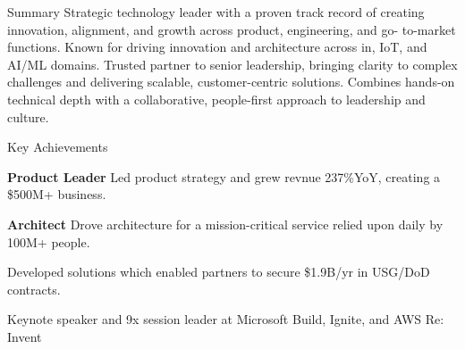 \documentclass{resume} %
\begin{document}
\vspace{-1em}
\begin{rSummary}{Summary}
  Strategic technology leader with a proven track record of creating innovation, alignment, and growth across product, engineering, and go- to-market functions. Known for driving innovation and architecture across in, IoT, and AI/ML domains.
  \newline \newline
  Trusted partner to senior leadership, bringing clarity to complex challenges and delivering scalable, customer-centric solutions. Combines hands-on technical depth with a collaborative, people-first approach to leadership and culture.
\end{rSummary}
\begin{rAchievements}{Key Achievements}
  \item \small\textbf{Product Leader} \newline Led product strategy and grew revnue 237\%YoY, creating a \$500M+ business.
  \item \small\textbf{Architect} \newline Drove architecture for a mission-critical service relied upon daily by 100M+ people.
  \item Developed solutions which enabled partners to secure \$1.9B/yr in USG/DoD contracts.
  \item Keynote speaker and 9x session leader at Microsoft Build, Ignite, and AWS Re: Invent
\end{rAchievements}

\end{document}
